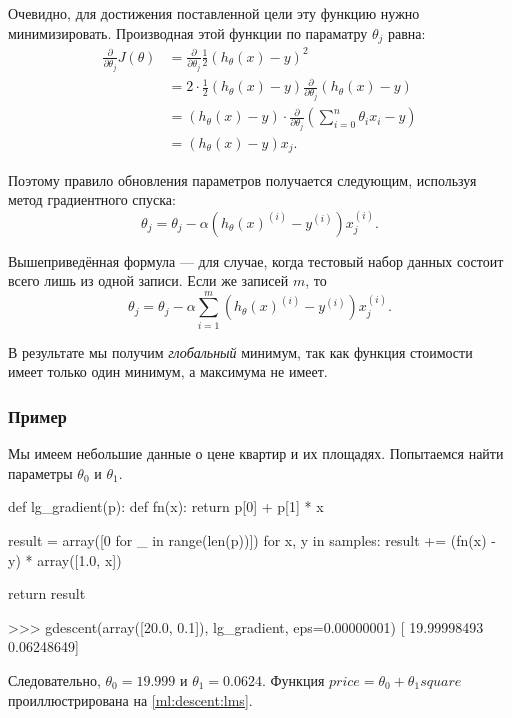 Очевидно, для достижения поставленной цели эту функцию нужно минимизировать. Производная этой функции по параматру $\theta_j$ равна:
\begin{align*}
\frac{\partial}{\partial \theta_j} J(\theta) &= \frac{\partial}{\partial \theta_j} \frac{1}{2} (h_\theta(x) - y)^2 \\
                                             &= 2 \cdot \frac{1}{2} (h_\theta(x) - y) \frac{\partial}{\partial \theta_j} (h_\theta(x) - y) \\
                                             &= (h_\theta(x) - y) \cdot \frac{\partial}{\partial \theta_j} \left( \sum_{i = 0}^n \theta_i x_i - y \right) \\
                                             &= (h_\theta(x) - y) x_j.
\end{align*}

Поэтому правило обновления параметров получается следующим, используя метод градиентного спуска:
\[
\theta_j = \theta_j - \alpha (h_\theta(x)^{(i)} - y^{(i)}) x_j^{(i)}.
\]

Вышеприведённая формула — для случае, когда тестовый набор данных состоит всего лишь из одной записи. Если же записей $m$, то
\[
\theta_j = \theta_j - \alpha \sum_{i = 1}^m (h_\theta(x)^{(i)} - y^{(i)}) x_j^{(i)}.
\]

В результате мы получим \emph{глобальный} минимум, так как функция стоимости имеет только один минимум, а максимума не имеет.

\subsubsection{Пример}

Мы имеем небольшие данные о цене квартир и их площадях. Попытаемся найти параметры $\theta_0$ и $\theta_1$.
\begin{pylst}{}{}
def lg_gradient(p):
    def fn(x):
        return p[0] + p[1] * x

    result = array([0 for _ in range(len(p))])
    for x, y in samples:
        result += (fn(x) - y) * array([1.0, x])

    return result

>>> gdescent(array([20.0, 0.1]), lg_gradient, eps=0.00000001)
[ 19.99998493   0.06248649]
\end{pylst}

Следовательно, $\theta_0 = 19.999$ и $\theta_1 = 0.0624$. Функция $price = \theta_0 + \theta_1 square$ проиллюстрирована на \autoref{ml:descent:lms}.

